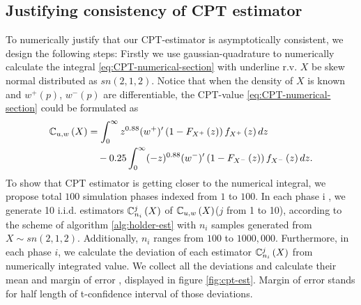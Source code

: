 
\subsection{Justifying consistency of CPT estimator}
To numerically justify that our CPT-estimator is asymptotically consistent, we design the following steps:
Firstly we use gaussian-quadrature to numerically calculate the integral \eqref{eq:CPT-numerical-section} with underline r.v. $X$ be skew normal distributed as $sn(2,1,2)$. Notice that when the density of $X$ is known and $w^+(p)$, $w^-(p)$ are differentiable, the CPT-value \eqref{eq:CPT-numerical-section} could be formulated as
\begin{align}
\mathbb{C}_{u,w}\left( X \right) & = \int_0^{\infty} z^{0.88} (w^{+})^\prime \left(1 - F_{X^+}\left(z\right)\right) f_{X^+}\left(z\right)dz \\
&\quad - 0.25 \int_0^{\infty} (-z)^{0.88} (w^{-})^\prime \left(1 - F_{X^-}\left(z\right)\right) f_{X^-}\left(z\right) dz.
\end{align}
To show that CPT estimator is getting closer to the numerical integral, we propose total $100$ simulation phases indexed from $1$ to $100$. In each phase i , we generate 10 i.i.d. estimators $\mathbb{C}^j_{n_i}\left(X\right)$ of $\mathbb{C}_{u,w}\left( X\right)$($j$ from 1 to 10), according to the scheme of algorithm \ref{alg:holder-est} with $n_i$ samples generated from $X \sim sn(2,1,2)$. Additionally, $n_i$ ranges from $100$ to $1000,000$. Furthermore, in each phase $i$, we calculate the deviation of each estimator $\mathbb{C}^j_{n_i}\left(X\right)$ from numerically integrated value. We collect all the deviations and calculate their mean and margin of error , displayed in figure \ref{fig:cpt-est}. Margin of error stands for half length of t-confidence interval of those deviations.

